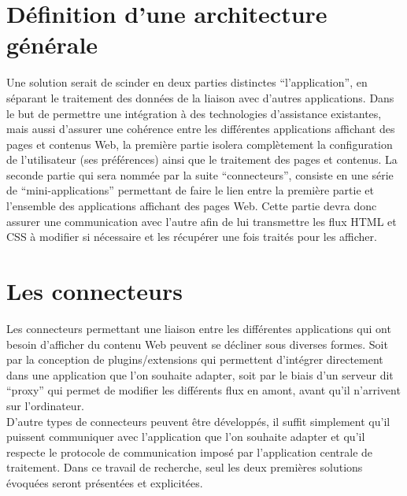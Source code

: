 \documentclass[french,a4paper]{report}
\begin{document}
{\section{Définition d'une architecture générale}
Une solution serait de scinder en deux parties distinctes
\enquote{l'application}, en séparant le traitement des données de la
liaison avec d'autres applications. \newline
Dans le but de permettre une intégration à des technologies
d'assistance existantes, mais aussi d'assurer une cohérence entre
les différentes applications affichant des pages et contenus Web, la
première partie isolera complètement la configuration de l'utilisateur
(ses préférences) ainsi que le traitement des pages et contenus.
\newline
La seconde partie qui sera nommée par la suite \enquote{connecteurs},
consiste en une série de \enquote{mini-applications} permettant de
faire le lien entre la première partie et l'ensemble des applications
affichant des pages Web. Cette partie devra donc assurer une
communication avec l'autre afin de lui transmettre les flux HTML et
CSS à modifier si nécessaire et les récupérer une fois traités pour
les afficher.
\section{Les connecteurs}
\label{refconnecteurs}
Les connecteurs permettant une liaison entre les différentes
applications qui ont besoin d'afficher du contenu Web peuvent se
décliner sous diverses formes. Soit par la conception de
plugins/extensions qui permettent d'intégrer directement dans une
application que l'on souhaite adapter, soit par le biais d'un serveur
dit \enquote{proxy} qui permet de modifier
les différents flux en amont, avant qu'il n'arrivent sur l'ordinateur. \\
D'autre types de connecteurs peuvent être développés, il suffit
simplement qu'il puissent communiquer avec l'application que l'on
souhaite adapter et qu'il respecte le protocole de communication
imposé par l'application centrale de traitement. Dans ce travail de
recherche, seul les deux premières solutions évoquées seront présentées
et explicitées.
}
\end{document}
